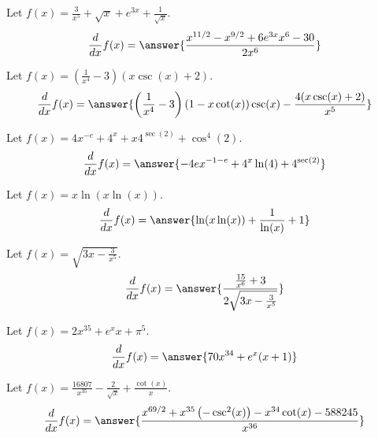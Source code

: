 \documentclass{ximera}
\begin{document}
\begin{shuffle}
\begin{exercise}
Let $f(x)=\frac{3}{x^5}+\sqrt{x}+e^{3 x}+\frac{1}{\sqrt{x}}$.
\[
\ddx f(x) = \answer{\frac{x^{11/2}-x^{9/2}+6 e^{3 x} x^6-30}{2 x^6}}
\]
\end{exercise}

\begin{exercise}
Let $f(x)=\left(\frac{1}{x^4}-3\right) (x \csc (x)+2)$.
\[
\ddx f(x) = \answer{\left(\frac{1}{x^4}-3\right) (1-x \cot (x)) \csc (x)-\frac{4 (x \csc (x)+2)}{x^5}}
\]
\end{exercise}

\begin{exercise}
Let $f(x)=4 x^{-e}+4^x+x 4^{\sec (2)}+\cos ^4(2)$.
\[
\ddx f(x) = \answer{-4 e x^{-1-e}+4^x \ln (4)+4^{\sec (2)}}
\]
\end{exercise}



\begin{exercise}
Let $f(x)=x \ln (x \ln (x))$.
\[
\ddx f(x) = \answer{\ln (x \ln (x))+\frac{1}{\ln (x)}+1}
\]
\end{exercise}

\begin{exercise}
Let $f(x)=\sqrt{3 x-\frac{3}{x^5}}$.
\[
\ddx f(x) = \answer{\frac{\frac{15}{x^6}+3}{2 \sqrt{3 x-\frac{3}{x^5}}}}
\]
\end{exercise}

\begin{exercise}
Let $f(x)=2 x^{35}+e^x x+\pi ^5$.
\[
\ddx f(x) = \answer{70 x^{34}+e^x (x+1)}
\]
\end{exercise}

\begin{exercise}
Let $f(x)=\frac{16807}{x^{35}}-\frac{2}{\sqrt{x}}+\frac{\cot (x)}{x}$.
\[
\ddx f(x) = \answer{\frac{x^{69/2}+x^{35} \left(-\csc ^2(x)\right)-x^{34} \cot (x)-588245}{x^{36}}}
\]
\end{exercise}


\end{shuffle}
\end{document}
